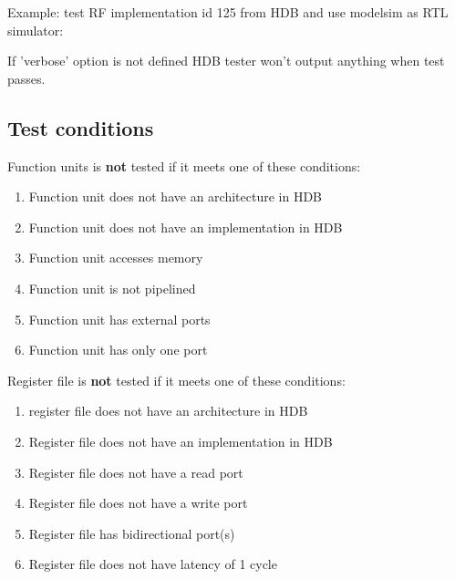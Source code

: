 \documentclass[a4paper,twoside]{tceusermanual}
\begin{document}

Example: test RF implementation id 125 from HDB and use modelsim as RTL
simulator:


If 'verbose' option is not defined HDB tester won't output anything when test
passes.

\subsection{Test conditions}

Function units is \textbf{not} tested if it meets one of these conditions:

\begin{enumerate}
 \item Function unit does not have an architecture in HDB

 \item Function unit does not have an implementation in HDB

 \item Function unit accesses memory

 \item Function unit is not pipelined

 \item Function unit has external ports

 \item Function unit has only one port
\end{enumerate}

Register file is \textbf{not} tested if it meets one of these conditions:

\begin{enumerate}
 \item register file does not have an architecture in HDB

 \item Register file does not have an implementation in HDB

 \item Register file does not have a read port

 \item Register file does not have a write port

 \item Register file has bidirectional port(s)

 \item Register file does not have latency of 1 cycle
\end{enumerate}
\end{document}
